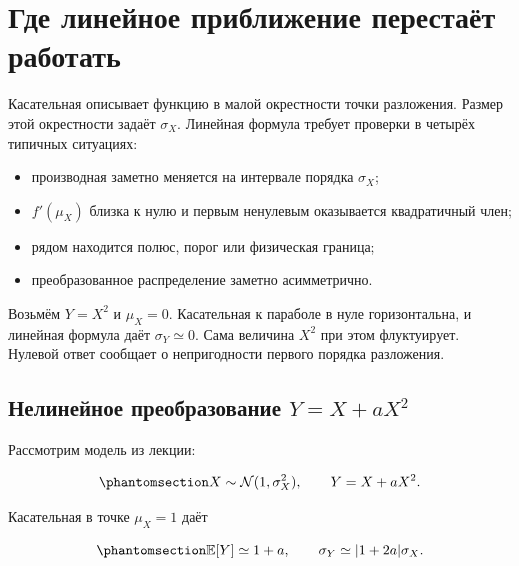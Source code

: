 \documentclass[
  russian,
  11pt,
  a4paper,
  open=any]{scrbook}
\providecommand{\tightlist}{%
  \setlength{\itemsep}{0pt}\setlength{\parskip}{0pt}}
\begin{document}
\section{Где линейное приближение перестаёт
работать}\label{ux433ux434ux435-ux43bux438ux43dux435ux439ux43dux43eux435-ux43fux440ux438ux431ux43bux438ux436ux435ux43dux438ux435-ux43fux435ux440ux435ux441ux442ux430ux451ux442-ux440ux430ux431ux43eux442ux430ux442ux44c}

Касательная описывает функцию в малой окрестности точки разложения.
Размер этой окрестности задаёт \(\sigma_X\). Линейная формула требует
проверки в четырёх типичных ситуациях:

\begin{itemize}
\tightlist
\item
  производная заметно меняется на интервале порядка \(\sigma_X\);
\item
  \(f'(\mu_X)\) близка к нулю и первым ненулевым оказывается
  квадратичный член;
\item
  рядом находится полюс, порог или физическая граница;
\item
  преобразованное распределение заметно асимметрично.
\end{itemize}

Возьмём \(Y=X^2\) и \(\mu_X=0\). Касательная к параболе в нуле
горизонтальна, и линейная формула даёт \(\sigma_Y\simeq0\). Сама
величина \(X^2\) при этом флуктуирует. Нулевой ответ сообщает о
непригодности первого порядка разложения.

\subsection{\texorpdfstring{Нелинейное преобразование
\(Y=X+aX^2\)}{Нелинейное преобразование Y=X+aX\^{}2}}\label{interactive-error-propagation-nonlinear}

Рассмотрим модель из лекции:

\begin{equation}\protect\phantomsection\label{eq-ch6-quadratic-transformation-model}{
X\sim\mathcal N(1,\sigma_X^2),
\qquad
Y=X+aX^2.
}\end{equation}

Касательная в точке \(\mu_X=1\) даёт

\begin{equation}\protect\phantomsection\label{eq-ch6-quadratic-linear-prediction}{
\mathbb E[Y]\simeq1+a,
\qquad
\sigma_Y\simeq|1+2a|\sigma_X.
}\end{equation}
\end{document}
